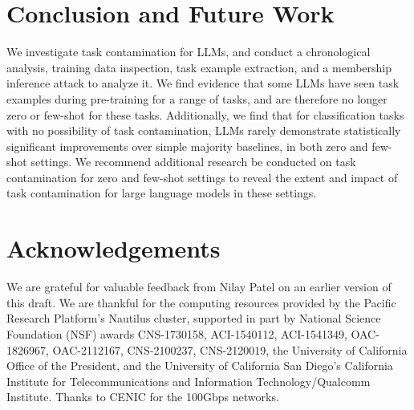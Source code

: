 \documentclass[letterpaper]{article} %
\newcommand{\jmf}[1]{}      %
\begin{document}




\section{Conclusion and Future Work}
We investigate task contamination for LLMs, and conduct a chronological analysis, training data inspection, task example extraction, and a membership inference attack to analyze it. We find evidence that some LLMs have seen task examples during pre-training for a range of tasks, and are therefore no longer zero or few-shot for these tasks.  Additionally, we find that for classification tasks with no possibility of task contamination, LLMs rarely demonstrate statistically significant improvements over simple majority baselines, in both zero and few-shot settings. We recommend additional research be conducted on task contamination for zero and few-shot settings to reveal the extent and impact of task contamination for large language models in these settings.

\section*{Acknowledgements}

We are grateful for valuable feedback from Nilay Patel on an earlier version of this draft.
We are thankful for the computing resources provided by the Pacific Research Platform's Nautilus cluster, supported in part by National Science Foundation (NSF) awards CNS-1730158, ACI-1540112, ACI-1541349, OAC-1826967, OAC-2112167, CNS-2100237, CNS-2120019, the University of California Office of the President, and the University of California San Diego's California Institute for Telecommunications and Information Technology/Qualcomm Institute. Thanks to CENIC for the 100Gbps networks.
\end{document}
